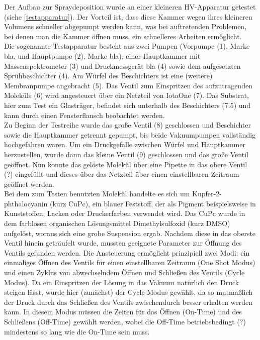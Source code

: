 Der Aufbau zur Spraydeposition wurde an einer kleineren HV-Apparatur getestet (siehe \ref{testapparatur}). Der
Vorteil ist, dass diese Kammer wegen ihres kleineren Volumens schneller abgepumpt werden kann, was bei
auftretenden Problemen, bei denen man die Kammer öffnen muss, ein schnelleres Arbeiten ermöglicht.\\
Die sogenannte Testapparatur besteht aus zwei Pumpen (Vorpumpe (1), Marke bla, und Hauptpumpe (2), Marke bla),
einer Hauptkammer mit Massenspektrometer (3) und Druckmessgerät bla (4) sowie dem aufgesetzten
Sprühbeschichter (4). Am Würfel des Beschichters ist eine (weitere) Membranpumpe angebracht (5). Das Ventil
zum Einspritzen des aufzutragenden Moleküls (6) wird angesteuert über ein Netzteil von IotaOne (7). Das
Substrat, hier zum Test ein Glasträger, befindet sich unterhalb des Beschichters (7.5) und kann durch einen
Fensterflansch beobachtet werden.\\
 Zu Beginn der Testreihe wurde das große Ventil (8) geschlossen und Beschichter sowie die Hauptkammer getrennt
 gepumpt, bis beide Vakuumpumpen vollständig hochgefahren waren. Um ein Druckgefälle zwischen Würfel und
 Hauptkammer herzustellen, wurde dann das kleine Ventil (9) geschlossen und das große Ventil geöffnet. Nun
 konnte das gelöste Molekül über eine Pipette in das obere Ventil (?) eingefüllt und dieses über das Netzteil
 über einen einstellbaren Zeitraum geöffnet werden.\\
Bei dem zum Testen benutzten Molekül handelte es sich um Kupfer-2-phthalocyanin (kurz CuPc), ein blauer
Feststoff, der als Pigment beispielsweise in Kunststoffen, Lacken oder Druckerfarben verwendet wird. Das CuPc
wurde in dem farblosen organischen Lösungsmittel Dimethylsulfoxid (kurz DMSO) aufgelöst, woraus sich eine
grobe Suspension ergab. Nachdem diese in das oberste Ventil hinein geträufelt wurde, mussten geeignete
Parameter zur Öffnung des Ventils gefunden werden. Die Ansteuerung ermöglicht prinzipiell zwei Modi: ein
einmaliges Öffnen des Ventils für einen einstellbaren Zeitraum (One Shot Modus) und einen Zyklus von
abwechselndem Öffnen und Schließen des Ventils (Cycle Modus). Da ein Einspritzen der Lösung in das Vakuum
natürlich den Druck steigen lässt, wurde hier (zunächst) der Cycle Modus gewählt, da so mutmaßlich der Druck
durch das Schließen des Ventils zwischendurch besser erhalten werden kann. In diesem Modus müssen die Zeiten
für das Öffnen (On-Time) und des Schließens (Off-Time) gewählt werden, wobei die Off-Time
betriebsbedingt (?) mindestens so lang wie die On-Time sein muss. \\
